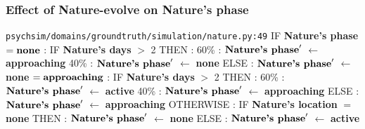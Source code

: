 \documentclass{article}%
\begin{document}
\subsubsection{Effect of Nature{-}evolve on Nature's phase}%
\label{ssubsec:Effect of Nature{-}evolve on Nature's phase}%
\begin{flushleft}%
\verb|psychsim/domains/groundtruth/simulation/nature.py:49|%
\linebreak%
IF %
\textbf{Nature's phase}%
\linebreak%
\hspace*{2em}%
$= \mbox{\textbf{none}}$%
: %
IF %
\textbf{Nature's days}%
$>$%
2%
\linebreak%
\hspace*{4em}%
THEN %
: %
\linebreak%
\hspace*{6em}%
60\%%
: %
$\mbox{\textbf{Nature's phase}} '$%
$\leftarrow$%
\textbf{approaching}%
\linebreak%
\hspace*{6em}%
40\%%
: %
$\mbox{\textbf{Nature's phase}} '$%
$\leftarrow$%
\textbf{none}%
\linebreak%
\hspace*{4em}%
ELSE %
: %
$\mbox{\textbf{Nature's phase}} '$%
$\leftarrow$%
\textbf{none}%
\linebreak%
\hspace*{2em}%
$= \mbox{\textbf{approaching}}$%
: %
IF %
\textbf{Nature's days}%
$>$%
2%
\linebreak%
\hspace*{4em}%
THEN %
: %
\linebreak%
\hspace*{6em}%
60\%%
: %
$\mbox{\textbf{Nature's phase}} '$%
$\leftarrow$%
\textbf{active}%
\linebreak%
\hspace*{6em}%
40\%%
: %
$\mbox{\textbf{Nature's phase}} '$%
$\leftarrow$%
\textbf{approaching}%
\linebreak%
\hspace*{4em}%
ELSE %
: %
$\mbox{\textbf{Nature's phase}} '$%
$\leftarrow$%
\textbf{approaching}%
\linebreak%
\hspace*{2em}%
OTHERWISE %
: %
IF %
\textbf{Nature's location}%
$=$%
\textbf{none}%
\linebreak%
\hspace*{4em}%
THEN %
: %
$\mbox{\textbf{Nature's phase}} '$%
$\leftarrow$%
\textbf{none}%
\linebreak%
\hspace*{4em}%
ELSE %
: %
$\mbox{\textbf{Nature's phase}} '$%
$\leftarrow$%
\textbf{active}%
\end{flushleft}
\end{document}
